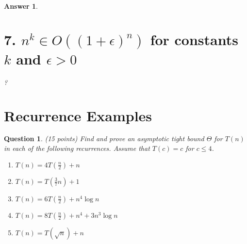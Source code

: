 \documentclass[a4paper]{article}
\theoremstyle{remarksStyle}
\theoremstyle{questionStyle}
\newtheorem{question}{Question}
\theoremstyle{answerStyle}
\newtheorem{answer}{Answer}
\begin{document}
\begin{answer}
\section*{7. \( n^k \in O((1+\epsilon)^n) \) for constants \( k \) and \( \epsilon > 0 \) }
?
\end{answer}

\newpage

\section {Recurrence Examples}
\begin{question} (15 points)
Find and prove an asymptotic tight bound $\Theta$ for $T(n)$ in each of the following recurrences. Assume that $T(c) = c$ for $c \le 4$.
\begin{enumerate}
    \item $T(n) = 4T(\frac{n}{2}) + n$
    \item $T(n) = T(\frac{3}{7}n) + 1$
    \item $T(n) = 6T(\frac{n}{2}) + n^4 \log{n}$
    \item $T(n) = 8T(\frac{n}{2}) + n^4 + 3n^3  \log{n} $
    \item $T(n) = T(\sqrt{n}) + n $
    
\end{enumerate}
\end{question}
\end{document}
